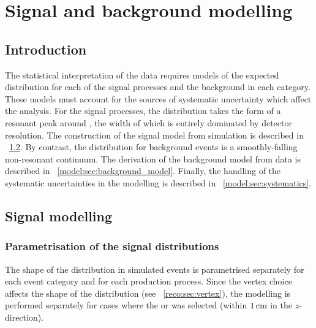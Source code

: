 \chapter{Signal and background modelling}
\label{chap:model}

\section{Introduction}
\label{model:sec:intro}

The statistical interpretation of the data requires models of the expected \mgg distribution for each of the signal processes and the background in each category. These models must account for the sources of systematic uncertainty which affect the analysis. %
For the signal processes, the \mgg distribution takes the form of a resonant peak around \mH, the width of which is entirely dominated by detector resolution. The construction of the signal model from simulation is described in \Sec~\ref{model:sec:signal_model}. By contrast, the \mgg distribution for background events is a smoothly-falling non-resonant continuum. The derivation of the background model from data is described in \Sec~\ref{model:sec:background_model}. Finally, the handling of the systematic uncertainties in the modelling is described in \Sec~\ref{model:sec:systematics}. 

\section{Signal modelling}
\label{model:sec:signal_model}

\subsection{Parametrisation of the signal \mgg distributions}

The shape of the \mgg distribution in simulated \Hgg events is parametrised separately for each event category and for each production process. %
Since the vertex choice affects the shape of the \mgg distribution (see \Sec~\ref{reco:sec:vertex}), the modelling is performed separately for cases where the \RV or \WV was selected (within $1\,\text{cm}$ in the $z$-direction).

